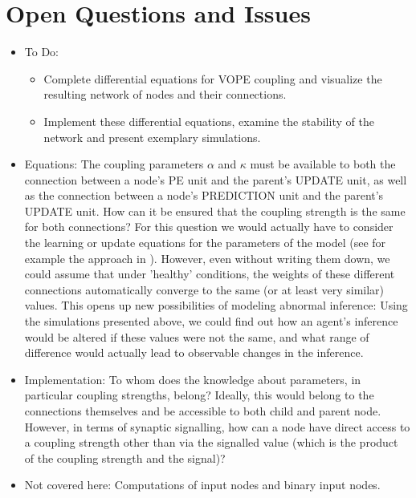 \section{Open Questions and Issues}

\begin{itemize}
	\item To Do: 
	\begin{itemize}
		\item Complete differential equations for \textsf{VOPE} coupling and visualize the resulting network of nodes and their connections.
		\item Implement these differential equations, examine the stability of the network and present exemplary simulations. 
	\end{itemize}
	
	\item Equations: The coupling parameters $\alpha$ and $\kappa$ must be available to both the connection between a node's \textsf{PE unit} and the parent's \textsf{UPDATE unit}, as well as the connection between a node's \textsf{PREDICTION unit} and the parent's \textsf{UPDATE unit}. How can it be ensured that the coupling strength is the same for both connections? For this question we would actually have to consider the learning or update equations for the parameters of the model (see for example the approach in \cite{Bogacz2017}). However, even without writing them down, we could assume that under 'healthy' conditions, the weights of these different connections automatically converge to the same (or at least very similar) values. This opens up new possibilities of modeling abnormal inference: Using the simulations presented above, we could find out how an agent's inference would be altered if these values were not the same, and what range of difference would actually lead to observable changes in the inference. 

	\item Implementation: To whom does the knowledge about parameters, in particular coupling strengths, belong? Ideally, this would belong to the connections themselves and be accessible to both child and parent node. However, in terms of synaptic signalling, how can a node have direct access to a coupling strength other than via the signalled value (which is the product of the coupling strength and the signal)?

	\item Not covered here: Computations of input nodes and binary input nodes.
\end{itemize}